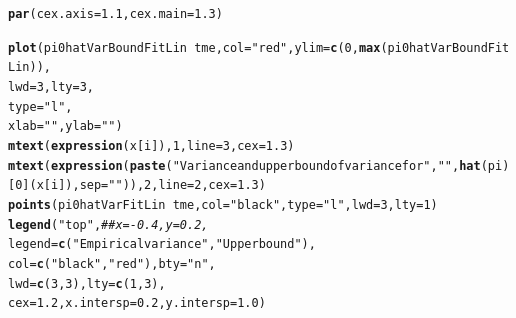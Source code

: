 \documentclass{article}\usepackage[]{graphicx}\usepackage[]{color}
\makeatletter
\newcommand{\hlnum}[1]{\textcolor[rgb]{0.686,0.059,0.569}{#1}}%
\newcommand{\hlstr}[1]{\textcolor[rgb]{0.192,0.494,0.8}{#1}}%
\newcommand{\hlcom}[1]{\textcolor[rgb]{0.678,0.584,0.686}{\textit{#1}}}%
\newcommand{\hlopt}[1]{\textcolor[rgb]{0,0,0}{#1}}%
\newcommand{\hlstd}[1]{\textcolor[rgb]{0.345,0.345,0.345}{#1}}%
\newcommand{\hlkwc}[1]{\textcolor[rgb]{0.333,0.667,0.333}{#1}}%
\newcommand{\hlkwd}[1]{\textcolor[rgb]{0.737,0.353,0.396}{\textbf{#1}}}%
\newenvironment{kframe}{%
 \def\at@end@of@kframe{}%
 \ifinner\ifhmode%
  \def\at@end@of@kframe{\end{minipage}}%
  \begin{minipage}{\columnwidth}%
 \fi\fi%
 \def\FrameCommand##1{\hskip\@totalleftmargin \hskip-\fboxsep
 \colorbox{shadecolor}{##1}\hskip-\fboxsep
     \hskip-\linewidth \hskip-\@totalleftmargin \hskip\columnwidth}%
 \MakeFramed {\advance\hsize-\width
   \@totalleftmargin\z@ \linewidth\hsize
   \@setminipage}}%
 {\par\unskip\endMakeFramed%
 \at@end@of@kframe}
\newenvironment{knitrout}{}{} %
\makeatother
\begin{document}
\begin{knitrout}
\color{fgcolor}\begin{kframe}
\begin{alltt}
\hlkwd{par}\hlstd{(}\hlkwc{cex.axis} \hlstd{=} \hlnum{1.1}\hlstd{,} \hlkwc{cex.main}\hlstd{=}\hlnum{1.3}\hlstd{)}

\hlkwd{plot}\hlstd{(pi0hatVarBoundFitLin} \hlopt{~} \hlstd{tme,} \hlkwc{col}\hlstd{=}\hlstr{"red"}\hlstd{,} \hlkwc{ylim}\hlstd{=}\hlkwd{c}\hlstd{(}\hlnum{0}\hlstd{,} \hlkwd{max}\hlstd{(pi0hatVarBoundFitLin)),}
     \hlkwc{lwd}\hlstd{=}\hlnum{3}\hlstd{,} \hlkwc{lty}\hlstd{=}\hlnum{3}\hlstd{,}
     \hlkwc{type}\hlstd{=}\hlstr{"l"}\hlstd{,}
     \hlkwc{xlab}\hlstd{=}\hlstr{""}\hlstd{,} \hlkwc{ylab}\hlstd{=}\hlstr{""}\hlstd{)}
\hlkwd{mtext}\hlstd{(}\hlkwd{expression}\hlstd{(x[i]),} \hlnum{1}\hlstd{,} \hlkwc{line}\hlstd{=}\hlnum{3}\hlstd{,} \hlkwc{cex}\hlstd{=}\hlnum{1.3}\hlstd{)}
\hlkwd{mtext}\hlstd{(}\hlkwd{expression}\hlstd{(}\hlkwd{paste}\hlstd{(}\hlstr{"Variance and upper bound of variance for "}\hlstd{,} \hlstr{" "}\hlstd{,} \hlkwd{hat}\hlstd{(pi)[}\hlnum{0}\hlstd{](x[i]),} \hlkwc{sep}\hlstd{=}\hlstr{" "}\hlstd{)),} \hlnum{2}\hlstd{,} \hlkwc{line}\hlstd{=}\hlnum{2}\hlstd{,} \hlkwc{cex}\hlstd{=}\hlnum{1.3}\hlstd{)}
\hlkwd{points}\hlstd{(pi0hatVarFitLin} \hlopt{~} \hlstd{tme,} \hlkwc{col}\hlstd{=}\hlstr{"black"}\hlstd{,} \hlkwc{type}\hlstd{=}\hlstr{"l"}\hlstd{,} \hlkwc{lwd}\hlstd{=}\hlnum{3}\hlstd{,} \hlkwc{lty}\hlstd{=}\hlnum{1}\hlstd{)}
\hlkwd{legend}\hlstd{(}\hlstr{"top"}\hlstd{,} \hlcom{##x=-0.4, y=0.2, }
       \hlkwc{legend}\hlstd{=}\hlkwd{c}\hlstd{(}\hlstr{"Empirical variance"}\hlstd{,} \hlstr{"Upper bound"}\hlstd{),}
       \hlkwc{col}\hlstd{=}\hlkwd{c}\hlstd{(}\hlstr{"black"}\hlstd{,} \hlstr{"red"}\hlstd{),} \hlkwc{bty}\hlstd{=}\hlstr{"n"}\hlstd{,}
       \hlkwc{lwd}\hlstd{=}\hlkwd{c}\hlstd{(}\hlnum{3}\hlstd{,}\hlnum{3}\hlstd{),} \hlkwc{lty}\hlstd{=}\hlkwd{c}\hlstd{(}\hlnum{1}\hlstd{,}\hlnum{3}\hlstd{),}
       \hlkwc{cex}\hlstd{=}\hlnum{1.2}\hlstd{,} \hlkwc{x.intersp}\hlstd{=}\hlnum{0.2}\hlstd{,} \hlkwc{y.intersp}\hlstd{=}\hlnum{1.0}\hlstd{)}
\end{alltt}
\end{kframe}


\end{knitrout}
\end{document}
